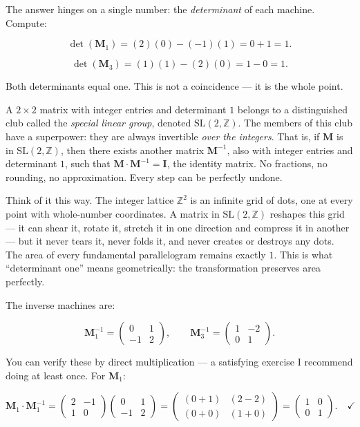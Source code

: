 The answer hinges on a single number: the \emph{determinant} of each machine. Compute:

\[
\det(\mathbf{M}_1) = (2)(0) - (-1)(1) = 0 + 1 = 1.
\]

\[
\det(\mathbf{M}_3) = (1)(1) - (2)(0) = 1 - 0 = 1.
\]

Both determinants equal one. This is not a coincidence --- it is the whole point.

A \(2 \times 2\) matrix with integer entries and determinant \(1\) belongs to a distinguished club called the \emph{special linear group}, denoted \(\mathrm{SL}(2, \mathbb{Z})\). The members of this club have a superpower: they are always invertible \emph{over the integers}. That is, if \(\mathbf{M}\) is in \(\mathrm{SL}(2, \mathbb{Z})\), then there exists another matrix \(\mathbf{M}^{-1}\), also with integer entries and determinant \(1\), such that \(\mathbf{M} \cdot \mathbf{M}^{-1} = \mathbf{I}\), the identity matrix. No fractions, no rounding, no approximation. Every step can be perfectly undone.

Think of it this way. The integer lattice \(\mathbb{Z}^2\) is an infinite grid of dots, one at every point with whole-number coordinates. A matrix in \(\mathrm{SL}(2, \mathbb{Z})\) reshapes this grid --- it can shear it, rotate it, stretch it in one direction and compress it in another --- but it never tears it, never folds it, and never creates or destroys any dots. The area of every fundamental parallelogram remains exactly \(1\). This is what ``determinant one'' means geometrically: the transformation preserves area perfectly.

The inverse machines are:

\[
\mathbf{M}_1^{-1} = \begin{pmatrix} 0 & 1 \\ -1 & 2 \end{pmatrix}, \qquad
\mathbf{M}_3^{-1} = \begin{pmatrix} 1 & -2 \\ 0 & 1 \end{pmatrix}.
\]

You can verify these by direct multiplication --- a satisfying exercise I recommend doing at least once. For \(\mathbf{M}_1\):

\[
\mathbf{M}_1 \cdot \mathbf{M}_1^{-1} = \begin{pmatrix} 2 & -1 \\ 1 & 0 \end{pmatrix} \begin{pmatrix} 0 & 1 \\ -1 & 2 \end{pmatrix} = \begin{pmatrix} (0+1) & (2-2) \\ (0+0) & (1+0) \end{pmatrix} = \begin{pmatrix} 1 & 0 \\ 0 & 1 \end{pmatrix}. \quad \checkmark
\]

